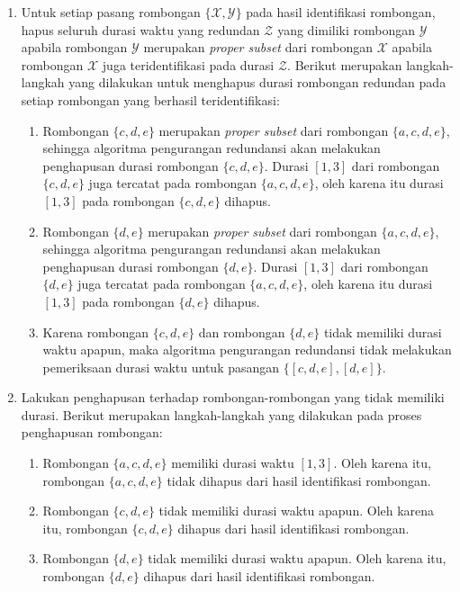 \begin{enumerate}
    \item Untuk setiap pasang rombongan $\{ \mathcal{X}, \mathcal{Y} \}$ pada hasil identifikasi rombongan, hapus seluruh durasi waktu yang redundan $\mathcal{Z}$ yang dimiliki rombongan $\mathcal{Y}$ apabila rombongan $\mathcal{Y}$ merupakan \textit{proper subset} dari rombongan $\mathcal{X}$ apabila rombongan $\mathcal{X}$ juga teridentifikasi pada durasi $\mathcal{Z}$. Berikut merupakan langkah-langkah yang dilakukan untuk menghapus durasi rombongan redundan pada setiap rombongan yang berhasil teridentifikasi:
    
    \begin{enumerate}
        \item Rombongan $\{c, d, e\}$ merupakan \textit{proper subset} dari rombongan $\{a, c, d, e\}$, sehingga algoritma pengurangan redundansi akan melakukan penghapusan durasi rombongan $\{c, d, e\}$. Durasi $[1, 3]$ dari rombongan $\{c, d, e\}$ juga tercatat pada rombongan $\{a, c, d, e\}$, oleh karena itu durasi $[1, 3]$ pada rombongan $\{c, d, e\}$ dihapus.
        \item Rombongan $\{d, e\}$ merupakan \textit{proper subset} dari rombongan $\{a, c, d, e\}$, sehingga algoritma pengurangan redundansi akan melakukan penghapusan durasi rombongan $\{d, e\}$. Durasi $[1, 3]$ dari rombongan $\{d, e\}$ juga tercatat pada rombongan $\{a, c, d, e\}$, oleh karena itu durasi $[1, 3]$ pada rombongan $\{d, e\}$ dihapus.
        \item Karena rombongan $\{c, d, e\}$ dan rombongan $\{d, e\}$ tidak memiliki durasi waktu apapun, maka algoritma pengurangan redundansi tidak melakukan pemeriksaan durasi waktu untuk pasangan $\{ [c, d, e], [d, e] \}$.
    \end{enumerate}
    
    \item Lakukan penghapusan terhadap rombongan-rombongan yang tidak memiliki durasi. Berikut merupakan langkah-langkah yang dilakukan pada proses penghapusan rombongan:
    
    \begin{enumerate}
        \item Rombongan $\{a, c, d, e\}$ memiliki durasi waktu $[1, 3]$. Oleh karena itu, rombongan $\{a, c, d, e\}$ tidak dihapus dari hasil identifikasi rombongan.
        \item Rombongan $\{ c, d, e \}$ tidak memiliki durasi waktu apapun. Oleh karena itu, rombongan $\{ c, d, e \}$ dihapus dari hasil identifikasi rombongan.
        \item Rombongan $\{ d, e \}$ tidak memiliki durasi waktu apapun. Oleh karena itu, rombongan $\{ d, e \}$ dihapus dari hasil identifikasi rombongan.
    \end{enumerate}
\end{enumerate}


